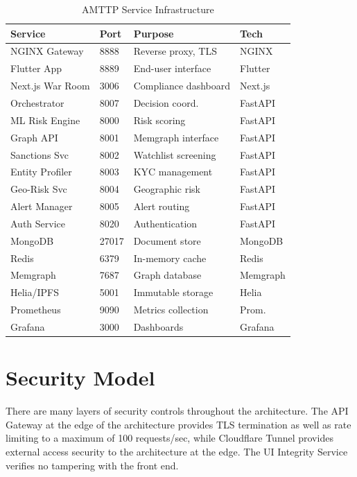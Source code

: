 \documentclass[journal]{IEEEtran}
\begin{document}
\begin{table}[!t]
\centering
\caption{AMTTP Service Infrastructure}
\label{tab:services}
\begin{tabular}{llll}
\toprule
\textbf{Service} & \textbf{Port} & \textbf{Purpose} & \textbf{Tech} \\
\midrule
NGINX Gateway & 8888 & Reverse proxy, TLS & NGINX \\
Flutter App & 8889 & End-user interface & Flutter \\
Next.js War Room & 3006 & Compliance dashboard & Next.js \\
Orchestrator & 8007 & Decision coord. & FastAPI \\
ML Risk Engine & 8000 & Risk scoring & FastAPI \\
Graph API & 8001 & Memgraph interface & FastAPI \\
Sanctions Svc & 8002 & Watchlist screening & FastAPI \\
Entity Profiler & 8003 & KYC management & FastAPI \\
Geo-Risk Svc & 8004 & Geographic risk & FastAPI \\
Alert Manager & 8005 & Alert routing & FastAPI \\
Auth Service & 8020 & Authentication & FastAPI \\
MongoDB & 27017 & Document store & MongoDB \\
Redis & 6379 & In-memory cache & Redis \\
Memgraph & 7687 & Graph database & Memgraph \\
Helia/IPFS & 5001 & Immutable storage & Helia \\
Prometheus & 9090 & Metrics collection & Prom. \\
Grafana & 3000 & Dashboards & Grafana \\
\bottomrule
\end{tabular}
\end{table}

\section{Security Model}

There are many layers of security controls throughout the architecture. The API Gateway at the edge of the architecture provides TLS termination as well as rate limiting to a maximum of 100 requests/sec, while Cloudflare Tunnel provides external access security to the architecture at the edge. The UI Integrity Service verifies no tampering with the front end.
\end{document}
